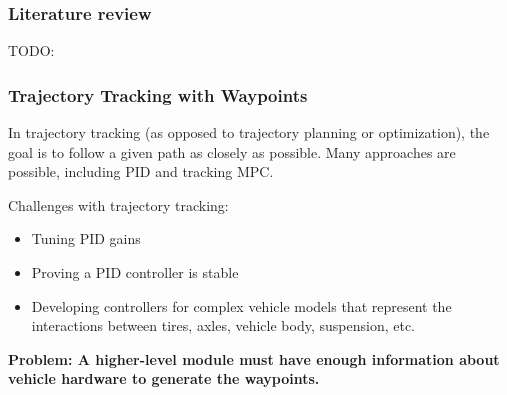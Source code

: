 \documentclass{beamer}
\begin{document}
%	



\begin{frame}
\frametitle{Literature review}

TODO: %
\end{frame}

\begin{frame}
	\frametitle{Trajectory Tracking with Waypoints}
In trajectory tracking (as opposed to trajectory planning or optimization), the goal is to follow a given path as closely as possible. Many approaches are possible, including	PID and tracking MPC.

Challenges with trajectory tracking:
	\begin{itemize}
		\item Tuning PID gains
		\item Proving a PID controller is stable
		\item Developing controllers for complex vehicle models that represent the interactions between tires, axles, vehicle body, suspension, etc.
	\end{itemize}
\textbf{Problem: A higher-level module must have enough information about vehicle hardware to generate the waypoints.}
\end{frame}
	
\end{document}
